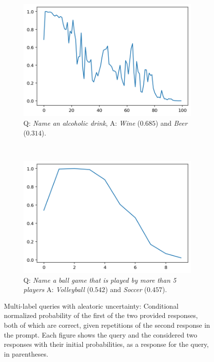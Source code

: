 \documentclass[a4paper]{article}
\theoremstyle{plain}
\theoremstyle{definition}
\theoremstyle{plain}
\begin{document}
\begin{figure}[t]
\begin{center}
\begin{subfigure}[t]{0.23\linewidth}
    \includegraphics[width=\textwidth]{prob_name_drink.png}
    \caption*{\tiny Q: \emph{Name an alcoholic drink}, A: \emph{Wine} ($0.685$) and \emph{Beer} ($0.314$).}
  \end{subfigure}  
  ~~
  \begin{subfigure}[t]{0.23\linewidth}
    \includegraphics[width=\textwidth]{prob_name_game.png}
    \caption*{\tiny Q: \emph{Name a ball game that is played by more than 5 players} A: \emph{Volleyball} ($0.542$) and \emph{Soccer} ($0.457$).}
  \end{subfigure}
\end{center}
\vspace{-4mm}
\caption{Multi-label queries with aleatoric uncertainty: 
Conditional normalized probability of the first of the two provided responses, both of which are correct, given repetitions of the second response in the prompt. Each figure shows the query and the considered two responses with their initial probabilities, as a response for the query, in parentheses.} 
\label{fig:multi-label-no-hallucination}
\end{figure}
\end{document}
